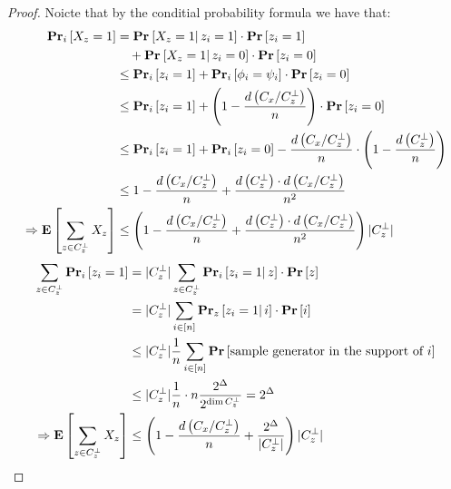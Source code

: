 \documentclass[manuscript,screen,review]{acmart}
\begin{document}
\newcommand{\dxnw}{  1 - \frac{d\left( C_{x}/C_{z}^{\perp} \right)}{n} } 
\newcommand{\dxn}{ \left( \dxnw \right)} 
\newcommand{\czp}{C_{z}^{\perp}}
\newcommand{\czpa}{|\czp |}
\newcommand{\forczp}[2]{ \sum_{#1 \in \czp}{#2} }  
\newcommand{\dismul}{  \frac{ d\left( \czp  \right) \cdot   d\left( C_{x}/C_{z}^{\perp} \right)}{n^{2} }}
\begin{proof}
  Noicte that by the conditial probability formula we have that: 
  \begin{equation*}
    \begin{split}
      \prbm{X_{z}=1}{i} &=  \prbcprb{}{X_{z}=1}{z_{i}=1}  \\ 
      & \ \ \ + \prbcprb{}{X_{z}=1}{z_{i}=0} \\ 
      & \le \prbm{z_{i}= 1 }{i} +  \prbm{\phi_{i} = \psi_{i}  }{i} \cdot \prb{z_{i}= 0 }  \\ 
      & \le \prbm{z_{i}= 1 }{i} +  \dxn \cdot \prb{z_{i}= 0 }  \\
      & \le \prbm{z_{i}= 1 }{i} + \prbm{z_{i}= 0 }{i} -   \frac{d\left( C_{x}/C_{z}^{\perp} \right)}{n} \cdot \left( 1 - \frac{d\left( \czp \right)}{n}   \right) \\ 
      & \le \dxnw + \dismul \\ 
      \Rightarrow \expp{\forczp{z}{X_{z}}} & \le \left( \dxnw  + \dismul \right)\czpa  
    \end{split}
  \end{equation*}
\begin{equation*}
  \begin{split}
    \forczp{z}{\prbm{z_{i}= 1 }{i}} & = \czpa \forczp{z}{\prbcprb{i}{z_{i}= 1 }{z}} \\
    & =   \czpa \sum_{i \in [n]}{\prbcprb{z}{z_{i}= 1 }{i}} \\
    & \le \czpa \frac{1}{n} \sum_{i\in [n]}{ \prb{ \text{sample generator in the support of } i  } }\\
    & \le \czpa \frac{1}{n} \cdot n \frac{2^{\Delta}}{2^{\dim \czp}} = 2^{\Delta} \\ 
    \Rightarrow  \expp{\forczp{z}{X_{z}}}  & \le \left( \dxnw + \frac{2^{\Delta}}{\czpa}  \right)\czpa
  \end{split}
\end{equation*}


\end{proof}
\printbibliography
\end{document}
